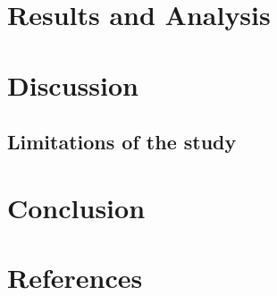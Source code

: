 \documentclass[11pt,preprint, authoryear]{elsarticle}
\numberwithin{equation}{section}
\numberwithin{figure}{section}
\numberwithin{table}{section}
\begin{document}
\hypertarget{results-and-analysis}{%
\section{Results and Analysis}\label{results-and-analysis}}

\hypertarget{discussion}{%
\section{Discussion}\label{discussion}}

\hypertarget{limitations-of-the-study}{%
\subsection{Limitations of the study}\label{limitations-of-the-study}}

\hypertarget{conclusion}{%
\section{Conclusion}\label{conclusion}}

\newpage

\hypertarget{references}{%
\section*{References}\label{references}}
\end{document}
